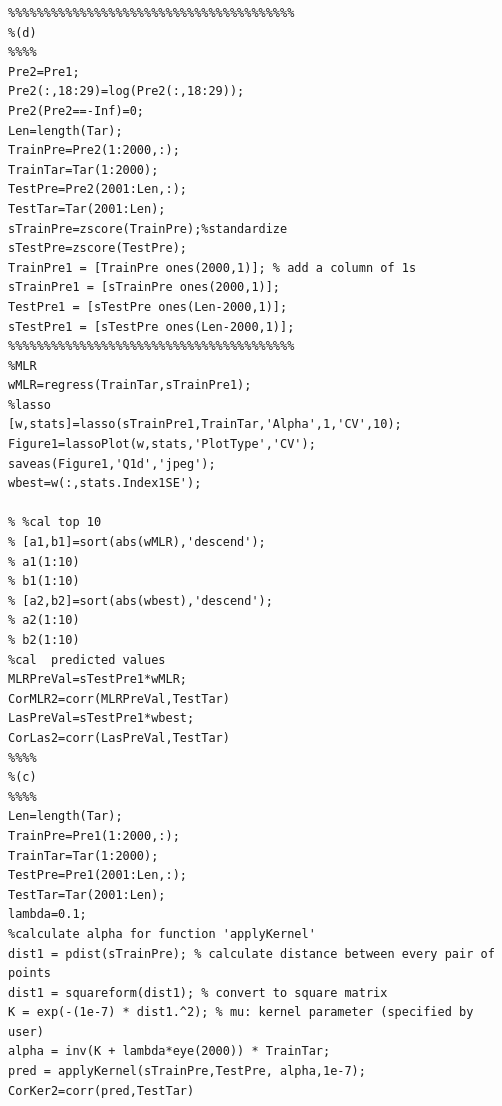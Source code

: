\documentclass[11pt]{scrartcl}
\begin{document}
\begin{lstlisting}
%%%%%%%%%%%%%%%%%%%%%%%%%%%%%%%%%%%%%%%%
%(d)
%%%%
Pre2=Pre1;
Pre2(:,18:29)=log(Pre2(:,18:29));
Pre2(Pre2==-Inf)=0;
Len=length(Tar);
TrainPre=Pre2(1:2000,:);
TrainTar=Tar(1:2000);
TestPre=Pre2(2001:Len,:);
TestTar=Tar(2001:Len);
sTrainPre=zscore(TrainPre);%standardize
sTestPre=zscore(TestPre);
TrainPre1 = [TrainPre ones(2000,1)]; % add a column of 1s
sTrainPre1 = [sTrainPre ones(2000,1)]; 
TestPre1 = [sTestPre ones(Len-2000,1)]; 
sTestPre1 = [sTestPre ones(Len-2000,1)]; 
%%%%%%%%%%%%%%%%%%%%%%%%%%%%%%%%%%%%%%%%
%MLR
wMLR=regress(TrainTar,sTrainPre1);
%lasso
[w,stats]=lasso(sTrainPre1,TrainTar,'Alpha',1,'CV',10);
Figure1=lassoPlot(w,stats,'PlotType','CV');
saveas(Figure1,'Q1d','jpeg');
wbest=w(:,stats.Index1SE');

% %cal top 10
% [a1,b1]=sort(abs(wMLR),'descend');
% a1(1:10)
% b1(1:10)
% [a2,b2]=sort(abs(wbest),'descend');
% a2(1:10)
% b2(1:10)
%cal  predicted values
MLRPreVal=sTestPre1*wMLR;
CorMLR2=corr(MLRPreVal,TestTar)
LasPreVal=sTestPre1*wbest;
CorLas2=corr(LasPreVal,TestTar)
%%%%
%(c)
%%%%
Len=length(Tar);
TrainPre=Pre1(1:2000,:);
TrainTar=Tar(1:2000);
TestPre=Pre1(2001:Len,:);
TestTar=Tar(2001:Len);
lambda=0.1;
%calculate alpha for function 'applyKernel'
dist1 = pdist(sTrainPre); % calculate distance between every pair of points
dist1 = squareform(dist1); % convert to square matrix
K = exp(-(1e-7) * dist1.^2); % mu: kernel parameter (specified by user)
alpha = inv(K + lambda*eye(2000)) * TrainTar;
pred = applyKernel(sTrainPre,TestPre, alpha,1e-7);
CorKer2=corr(pred,TestTar)
\end{lstlisting}
\end{document}
